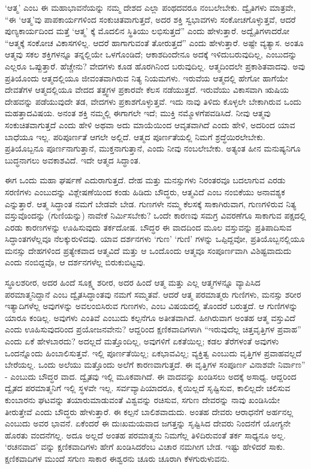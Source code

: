 ‘ಆತ್ಮ’ ಎಂಬ ಈ ಮಹಾಭಾವನೆಯನ್ನು ನಮ್ಮ ದೇಶದ ಎಲ್ಲಾ ಪಂಥದವರೂ ನಂಬಲೇಬೇಕು. ದ್ವೈತಿಗಳು ಮಾತ್ರವೇ, “ಈ ‘ಆತ್ಮ’ವು ಪಾಪಕಾರ್ಯಗಳಿಂದ ಸಂಕುಚಿತವಾಗುತ್ತದೆ, ಅದರ ಶಕ್ತಿ ಸ್ವಭಾವಗಳು ಸಂಕೋಚಗೊಳ್ಳುತ್ತವೆ, ಆದರೆ ಪುಣ್ಯಕಾರ್ಯದಿಂದ ಮತ್ತೆ ‘ಆತ್ಮ’ ಕ್ಕೆ ಮೊದಲಿನ ಸ್ಥಿತಿಯು ಲಭಿಸುತ್ತದೆ” ಎಂದು ಹೇಳುತ್ತಾರೆ. ಅದ್ವೈತಿಗಳಾದರೋ “ಆತ್ಮಕ್ಕೆ ಸಂಕೋಚ ವಿಕಾಸಗಳಿಲ್ಲ. ಆದರೆ ಹಾಗಾಗುವಂತೆ ತೋರುತ್ತದೆ” ಎಂದು ಹೇಳುತ್ತಾರೆ. ಅಷ್ಟೇ ವ್ಯತ್ಯಾಸ. ಅಂತೂ ಆತ್ಮವು ಸಕಲ ಶಕ್ತಿಗಳನ್ನೂ ತನ್ನಲ್ಲಿಯೇ ಒಳಗೊಂಡಿದೆ; ಆಕಾಶದಿಂದೇನೂ ಅದಕ್ಕೆ ಇಳಿದುಬರುವುದಿಲ್ಲ, ಎಂಬುದನ್ನು ಎಲ್ಲರೂ ಒಪ್ಪುತ್ತಾರೆ. ಹೆಚ್ಚೇನು? ವೇದಗಳು ಕೂಡ ಹೊರಗಿನಿಂದ ಬರುವುದಿಲ್ಲ. ಆತ್ಮದಿಂದಲೇ ಪ್ರಕಾಶಿತವಾದವು. ಅವು ಪ್ರತಿಯೊಂದು ಆತ್ಮದಲ್ಲಿಯೂ ಜೀವಂತವಾಗಿರುವ ನಿತ್ಯ ನಿಯಮಗಳು. ಇರುವೆಯ ಆತ್ಮದಲ್ಲಿ ಹೇಗೋ ಹಾಗೆಯೇ ದೇವತೆಗಳ ಆತ್ಮದಲ್ಲಿಯೂ ವೇದದ ತತ್ತ್ವಗಳ ಪ್ರಕಾರವೇ ಕೆಲಸ ನಡೆಯುತ್ತದೆ. ಇರುವೆಯು ವಿಕಾಸವಾಗಿ ಋಷಿಯ ದೇಹವನ್ನು ಪಡೆಯುವುದೇ ತಡ, ವೇದಗಳು ಪ್ರಕಾಶಗೊಳ್ಳುತ್ತವೆ. ಇದು ನಾವು ತಿಳಿದು ಕೊಳ್ಳಲೇ ಬೇಕಾಗಿರುವ ಒಂದು ಮಹತ್ತಾದ\break ವಿಷಯ. ಅನಂತ ಶಕ್ತಿ ನಮ್ಮಲ್ಲಿ ಈಗಾಗಲೇ ಇದೆ; ಮುಕ್ತಿ ನಮ್ಮೊಳಗೆ\break ಪವಡಿಸಿದೆ. ನೀವು ಆತ್ಮವು ಸಂಕುಚಿತವಾಗುತ್ತದೆ ಎಂದು ಹೇಳಿ ಅಥವಾ ಅದು ಮಾಯೆಯಿಂದ ಆವೃತವಾಗಿದೆ ಎಂದು ಹೇಳಿ, ಅದರಿಂದ ಯಾವ ಬಾಧೆಯೂ ಇಲ್ಲ. ಪರಿಪೂರ್ಣತೆ ಆಗಲೇ ಅಲ್ಲಿದೆ. ಆತ್ಮದ ಪೂರ್ಣತೆಯಲ್ಲಿ ನಿಮಗೆ ಶ್ರದ್ಧೆಯಿರಲೇಬೇಕು. ಪ್ರತಿಯೊಬ್ಬನೂ ಪೂರ್ಣನಾಗುತ್ತಾನೆ, ಮುಕ್ತನಾಗುತ್ತಾನೆ, ಎಂದು ನೀವು ನಂಬಲೇಬೇಕು. ಅತ್ಯಂತ ಹೀನ ಮನುಷ್ಯನಿಗೂ ಬುದ್ಧನಾಗಲು ಅವಕಾಶವಿದೆ. ಇದೇ ಆತ್ಮದ ಸಿದ್ಧಾಂತ.

ಈಗ ಒಂದು ಮಹಾ ಘರ್ಷಣೆ ಎದುರಾಗುತ್ತದೆ. ದೇಹ ಮತ್ತು ಮನಸ್ಸುಗಳು ನಿರಂತರವೂ ಬದಲಾಗುವ ಎರಡು ಸರಣಿಗಳು ಎಂಬುದನ್ನು ವಿಶ್ಲೇಷಣೆಯಿಂದ ಕಂಡು ಹಿಡಿದು ಬೌದ್ಧರು, ಆತ್ಮವಿದೆ ಎಂಬ ನಂಬಿಕೆಯು ಅನಾವಶ್ಯಕ ಎನ್ನುತ್ತಾರೆ. ಆತ್ಮ ಸಿದ್ಧಾಂತ ನಮಗೆ ಬೇಡವೇ ಬೇಡ. ಗುಣಗಳೇ ನಮ್ಮ ಕೆಲಸಕ್ಕೆ ಸಾಕಾಗಿರುವಾಗ, ಗುಣಗಳಿರುವ ನಿತ್ಯ ವಸ್ತುವೊಂದನ್ನು (ಗುಣಿಯನ್ನು) ನಾವೇಕೆ ನಿರ್ಮಿಸಬೇಕು? ಒಂದೇ ಕಾರಣವು ಸಮಗ್ರ ವಿವರಣೆಗೂ ಸಾಕಾಗುವ ಪಕ್ಷದಲ್ಲಿ ಎರಡು ಕಾರಣಗಳನ್ನು ಊಹಿಸುವುದು ತರ್ಕದೋಷ. ಬೌದ್ಧರ ಈ ವಾದದಿಂದ ಮೂಲ ವಸ್ತುವನ್ನು ಪ್ರತಿಪಾದಿಸುವ ಸಿದ್ಧಾಂತಗಳೆಲ್ಲವೂ ನೆಲಕ್ಕುರುಳಿದವು. ಯಾವ ದರ್ಶನಗಳು ‘ಗುಣ’ ‘ಗುಣಿ’ ಗಳನ್ನು ಒಪ್ಪಿದ್ದವೋ, ಪ್ರತಿಯೊಬ್ಬನಲ್ಲಿಯೂ ಮನಸ್ಸು ದೇಹಗಳಿಂದ ಪ್ರತ್ಯೇಕವಾದ ಆತ್ಮವಿದೆ ಮತ್ತು ಆ ಒಂದೊಂದು ಆತ್ಮವೂ ಸಂಪೂರ್ಣವಾಗಿ ವಿಶಿಷ್ಟವಾದುದು ಎಂದು ನಂಬಿದ್ದವೊ, ಆ ದರ್ಶನಗಳೆಲ್ಲ ಬಿರುಕುಬಿಟ್ಟವು.

ಸ್ಥೂಲಶರೀರ, ಅದರ ಹಿಂದೆ ಸೂಕ್ಷ್ಮ ಶರೀರ, ಅದರ ಹಿಂದೆ ಆತ್ಮ ಮತ್ತು ಎಲ್ಲ ಆತ್ಮಗಳನ್ನೂ ವ್ಯಾಪಿಸಿದ ಪರಮಾತ್ಮನಿದ್ದಾನೆ ಎಂಬ ದ್ವೈತಸಿದ್ಧಾಂತವು ನಮಗೆ ಸಮ್ಮತವೆ. ಆದರೆ ಆತ್ಮ ಪರಮಾತ್ಮರು ಗುಣಿಗಳು, ಮನಸ್ಸು ಶರೀರ ಇತ್ಯಾದಿಗಳೆಲ್ಲ ಅವುಗಳನ್ನು ಅವಲಂಬಿಸಿರುವ ಗುಣಗಳು, ಎಂಬ ವಿಷಯದಲ್ಲಿ ತೊಂದರೆ ಬರುತ್ತದೆ. ಆ ಗುಣಿಗಳನ್ನು ಯಾರೂ ಕಂಡಿಲ್ಲ. ಅವುಗಳು ಎಂತಿವೆ ಎಂಬುದು ಕಲ್ಪನೆಗೂ ಅತೀತವಾಗಿದೆ. ಹೀಗಿರುವಾಗ ಅಂತಹ ಆತ್ಮ ವಸ್ತುವಿದೆ ಎಂದು ಊಹಿಸುವುದರಿಂದ ಪ್ರಯೋಜನವೇನು? ಆದ್ದರಿಂದ ಕ್ಷಣಿಕವಾದಿಗಳಾಗಿ “ಇರುವುದೆಲ್ಲ ಚಿತ್ತವೃತ್ತಿಗಳ ಪ್ರವಾಹ” ಎಂದು ಏಕೆ ಹೇಳಬಾರದು? ಅದಲ್ಲದೆ ಮತ್ತೊಂದಿಲ್ಲ, ಅವುಗಳಿಗೆ ಏಕತೆಯಿಲ್ಲ; ಕಡಲ ತೆರೆಗಳಂತೆ ಅವುಗಳು ಒಂದನ್ನೊಂದು ಹಿಂಬಾಲಿಸುತ್ತವೆ. ಇಲ್ಲಿ ಪೂರ್ಣತೆಯಿಲ್ಲ; ಏಕಭಾವವಿಲ್ಲ; ವ್ಯಕ್ತಿತ್ವ ಎಂಬುದು ವೃತ್ತಿಗಳ ಪ್ರವಾಹವಲ್ಲದೆ ಬೇರೆಯಲ್ಲ. ಒಂದು ಅಲೆಯು ಮತ್ತೊಂದು ಅಲೆಗೆ ಕಾರಣವಾಗುತ್ತದೆ. ಈ ವೃತ್ತಿಗಳ ಸಂಪೂರ್ಣ ವಿನಾಶವೇ ನಿರ್ವಾಣ” - ಎಂಬುದು ಬೌದ್ಧರ ವಾದ. ದ್ವೈತವು ಇಲ್ಲಿ ಮೂಕವಾಗಿದೆ. ಈ ವಾದವನ್ನು ಖಂಡಿಸಲು ಅದಕ್ಕೆ ಅಸಾಧ್ಯ. ಆದ್ದರಿಂದ ದ್ವೈತದ ಪರಮಾತ್ಮನಿಗೆ ಇಲ್ಲಿ ಸ್ಥಳವೇ ಇಲ್ಲ. ಸರ್ವವ್ಯಾಪಿಯಾದರೂ, ಕೈಯಿಲ್ಲದೆ ಸೃಷ್ಟಿಸುವ, ಕಾಲಿಲ್ಲದೇ ಚಲಿಸುವ ಕುಂಬಾರನು ಘಟವನ್ನು ತಯಾರುಮಾಡುವಂತೆ ವಿಶ್ವವನ್ನು ರಚಿಸುವ, ಸಗುಣ ದೇವರನ್ನು ನಾವು ಖಂಡಿಸಿಯೇ ತೀರುತ್ತೇವೆ ಎಂದು ಬೌದ್ಧರು ಹೇಳುತ್ತಾರೆ. ಈ ಕಲ್ಪನೆ ಬಾಲಿಶವಾದುದು. ಅಂತಹ ದೇವರು ಆರಾ\-ಧನೆಗೆ ಅರ್ಹನಲ್ಲ ಎಂಬುದು ಅವರ ಭಾವನೆ. ಏಕೆಂದರೆ ಈ ದುಃಖಮಯವಾದ ಜಗತ್ತನ್ನು ಸೃಷ್ಟಿಸಿದ ದೇವರು ನಿಂದನೆಗೆ ಯೋಗ್ಯನೇ ಹೊರತು ವಂದನೆಗಲ್ಲ. ಅದೂ ಅಲ್ಲದೆ ಅಂತಹ ಪರಮಾತ್ಮನು ನಿಮಗೆಲ್ಲ ತಿಳಿದಿರುವಂತೆ ತರ್ಕ ಸಾಧ್ಯನೂ ಅಲ್ಲ. ‘ರಚನವಾದ’  ವನ್ನು ಕ್ಷಣಿಕವಾದಿಗಳು ಹೇಗೆ ಖಂಡಿಸಿದರೆಂಬ ವಿಚಾರ ನಮಗೀಗ ಬೇಡ. ಇಷ್ಟು ಹೇಳಿದರೆ ಸಾಕು. ಕ್ಷಣಿಕವಾದಿಗಳ ಮುಂದೆ ಸಗುಣ ಸಾಕಾರ ಈಶ್ವರನು ಚೂರು ಚೂರಾಗಿ ಕೆಳ\-ಗುರುಳುವನು.

